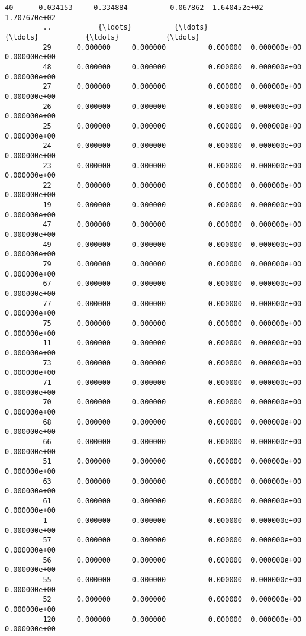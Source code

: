 \documentclass[11pt]{article}
\begin{document}
\begin{Verbatim}[commandchars=\\\{\}]
         40      0.034153     0.334884          0.067862 -1.640452e+02  1.707670e+02   
         ..           {\ldots}          {\ldots}               {\ldots}           {\ldots}           {\ldots}   
         29      0.000000     0.000000          0.000000  0.000000e+00  0.000000e+00   
         48      0.000000     0.000000          0.000000  0.000000e+00  0.000000e+00   
         27      0.000000     0.000000          0.000000  0.000000e+00  0.000000e+00   
         26      0.000000     0.000000          0.000000  0.000000e+00  0.000000e+00   
         25      0.000000     0.000000          0.000000  0.000000e+00  0.000000e+00   
         24      0.000000     0.000000          0.000000  0.000000e+00  0.000000e+00   
         23      0.000000     0.000000          0.000000  0.000000e+00  0.000000e+00   
         22      0.000000     0.000000          0.000000  0.000000e+00  0.000000e+00   
         19      0.000000     0.000000          0.000000  0.000000e+00  0.000000e+00   
         47      0.000000     0.000000          0.000000  0.000000e+00  0.000000e+00   
         49      0.000000     0.000000          0.000000  0.000000e+00  0.000000e+00   
         79      0.000000     0.000000          0.000000  0.000000e+00  0.000000e+00   
         67      0.000000     0.000000          0.000000  0.000000e+00  0.000000e+00   
         77      0.000000     0.000000          0.000000  0.000000e+00  0.000000e+00   
         75      0.000000     0.000000          0.000000  0.000000e+00  0.000000e+00   
         11      0.000000     0.000000          0.000000  0.000000e+00  0.000000e+00   
         73      0.000000     0.000000          0.000000  0.000000e+00  0.000000e+00   
         71      0.000000     0.000000          0.000000  0.000000e+00  0.000000e+00   
         70      0.000000     0.000000          0.000000  0.000000e+00  0.000000e+00   
         68      0.000000     0.000000          0.000000  0.000000e+00  0.000000e+00   
         66      0.000000     0.000000          0.000000  0.000000e+00  0.000000e+00   
         51      0.000000     0.000000          0.000000  0.000000e+00  0.000000e+00   
         63      0.000000     0.000000          0.000000  0.000000e+00  0.000000e+00   
         61      0.000000     0.000000          0.000000  0.000000e+00  0.000000e+00   
         1       0.000000     0.000000          0.000000  0.000000e+00  0.000000e+00   
         57      0.000000     0.000000          0.000000  0.000000e+00  0.000000e+00   
         56      0.000000     0.000000          0.000000  0.000000e+00  0.000000e+00   
         55      0.000000     0.000000          0.000000  0.000000e+00  0.000000e+00   
         52      0.000000     0.000000          0.000000  0.000000e+00  0.000000e+00   
         120     0.000000     0.000000          0.000000  0.000000e+00  0.000000e+00   
         

\end{Verbatim}
\end{document}
